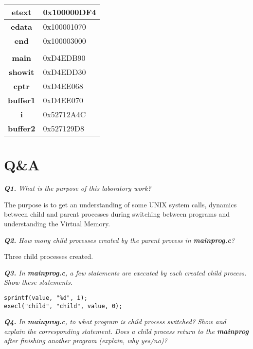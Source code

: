 \documentclass[11pt]{article}
\begin{document}
\vspace{10mm}
\hspace{45mm}
\begin{tabular}{|c|l|}
\hline
\textbf{etext}   & 0x100000DF4 \\ \hline
\textbf{edata}   & 0x100001070 \\ \hline
\textbf{end}     & 0x100003000 \\ \hline
\textbf{}        &             \\ \hline
\textbf{main}    & 0xD4EDB90   \\ \hline
\textbf{showit}  & 0xD4EDD30   \\ \hline
\textbf{cptr}    & 0xD4EE068   \\ \hline
\textbf{buffer1} & 0xD4EE070   \\ \hline
\textbf{i}       & 0x52712A4C  \\ \hline
\textbf{buffer2} & 0x527129D8  \\ \hline
\end{tabular}


\section*{Q\&A}

\textit{\textbf{Q1.} What is the purpose of this laboratory work?}
\vspace{3mm}

The purpose is to get an understanding of some UNIX system calls, dynamics between child and parent processes during switching between programs and understanding the Virtual Memory.

\vspace{3mm}
\textit{\textbf{Q2.} How mony child processes created by the parent process in \textbf{mainprog.c}?}
\vspace{3mm}

Three child processes created.

\vspace{3mm}
\textit{\textbf{Q3.} In \textbf{mainprog.c}, a few statements are executed by each created child process. Show these statements.}
\vspace{3mm}

\begin{lstlisting}[frame=tlrb]
sprintf(value, "%d", i);
execl("child", "child", value, 0);
\end{lstlisting}

\vspace{5mm}
\textit{\textbf{Q4.} In \textbf{mainprog.c}, to what program is child process switched? Show and explain the corresponding statement. Does a child process return to the \textbf{mainprog} after finishing another program (explain, why yes/no)?}
\vspace{5mm}
\end{document}
